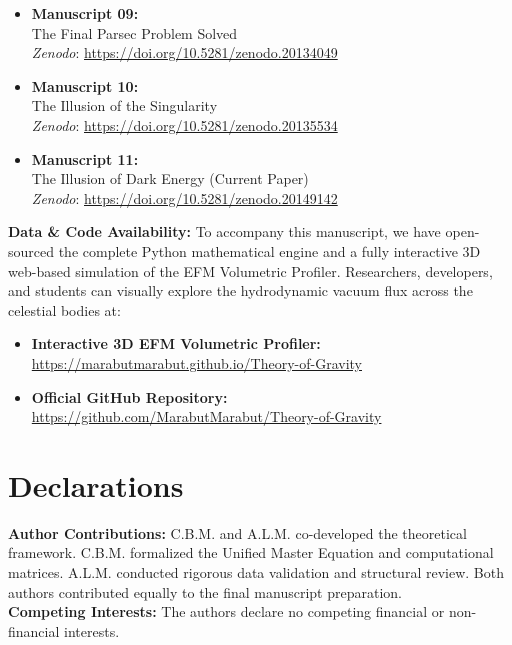 \documentclass[11pt, a4paper, table]{article}
\begin{document}
\begin{itemize}
    \item \textbf{Manuscript 09:} \\ The Final Parsec Problem Solved \\ \textit{Zenodo}: \url{https://doi.org/10.5281/zenodo.20134049}

    \item \textbf{Manuscript 10:} \\ The Illusion of the Singularity \\ \textit{Zenodo}: \url{https://doi.org/10.5281/zenodo.20135534}
    
    \item \textbf{Manuscript 11:} \\ The Illusion of Dark Energy (Current Paper) \\ \textit{Zenodo}: \url{https://doi.org/10.5281/zenodo.20149142}
  \end{itemize}

  \clearpage
  \vspace{1em}
  \noindent \textbf{Data \& Code Availability:} To accompany this manuscript, we have open-sourced the complete Python mathematical engine and a fully interactive 3D web-based simulation of the EFM Volumetric Profiler. Researchers, developers, and students can visually explore the hydrodynamic vacuum flux across the celestial bodies at: 
  \begin{itemize}
    \item \textbf{Interactive 3D EFM Volumetric Profiler:} \\ \url{https://marabutmarabut.github.io/Theory-of-Gravity}
    
    \item \textbf{Official GitHub Repository:} \\ \url{https://github.com/MarabutMarabut/Theory-of-Gravity}
  \end{itemize}
  
\clearpage
\section*{Declarations}
\textbf{Author Contributions:} C.B.M. and A.L.M. co-developed the theoretical framework. C.B.M. formalized the Unified Master Equation and computational matrices. A.L.M. conducted rigorous data validation and structural review. Both authors contributed equally to the final manuscript preparation. \\[0.5em]
\textbf{Competing Interests:} The authors declare no competing financial or non-financial interests.
\end{document}
